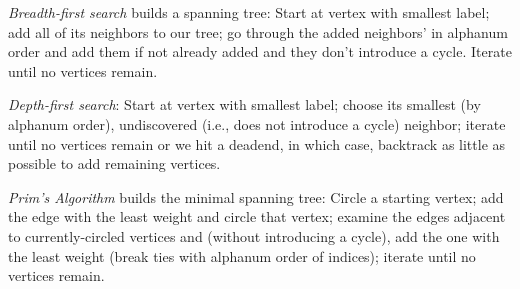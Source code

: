 \documentclass[10pt,letterpaper,twocolumn]{article}
\begin{document}
\emph{Breadth-first search} builds a spanning tree:
Start at vertex with smallest label; add all of
its neighbors to our tree; go through the added
neighbors' in alphanum order and add them
if not already added and they don't introduce a
cycle. Iterate until no vertices remain. 

\emph{Depth-first search}: Start at vertex with 
smallest label; choose its smallest 
(by alphanum order), undiscovered (i.e., does
not introduce a cycle) neighbor; iterate until 
no vertices remain or we hit a deadend, in which
case, backtrack as little as possible to add 
remaining vertices. 

\emph{Prim's Algorithm} builds the minimal 
spanning tree: Circle a starting vertex; add
the edge with the least weight and circle
that vertex; examine the edges adjacent to 
currently-circled vertices and (without introducing
a cycle), add the one with the least weight
(break ties with alphanum order of indices);
iterate until no vertices remain.
\end{document}
